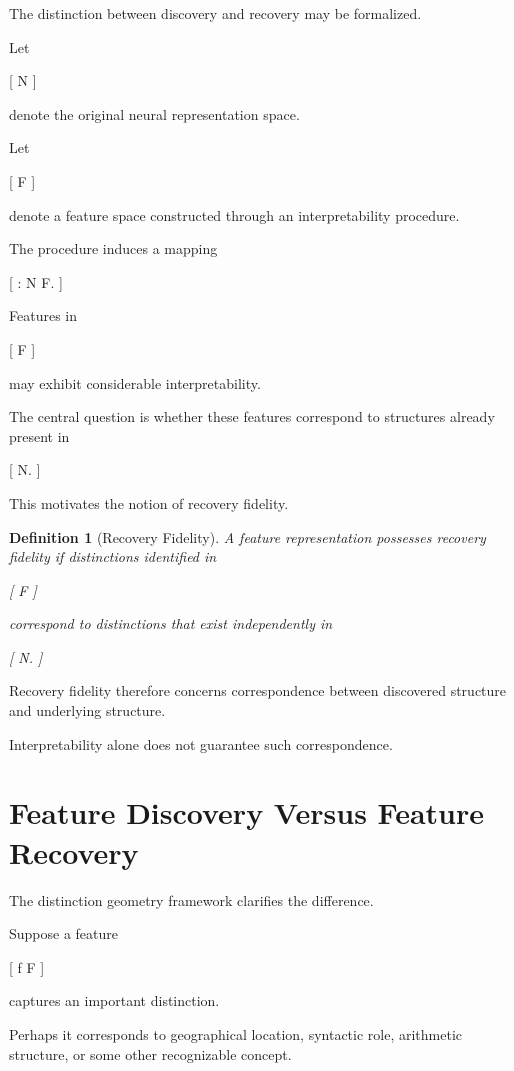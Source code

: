 \documentclass[11pt,oneside,openany]{book}
\newtheorem{definition}{Definition}[chapter] \newtheorem{theorem}{Theorem}[chapter] \newtheorem{proposition}{Proposition}[chapter] \newtheorem{lemma}{Lemma}[chapter] \newtheorem{corollary}{Corollary}[chapter] \newtheorem{remark}{Remark}[chapter]
\begin{document}
The distinction between discovery and recovery may be formalized.

Let

[
\mathcal N
]

denote the original neural representation space.

Let

[
\mathcal F
]

denote a feature space constructed through an interpretability procedure.

The procedure induces a mapping

[
\rho
:
\mathcal N
\rightarrow
\mathcal F.
]

Features in

[
\mathcal F
]

may exhibit considerable interpretability.

The central question is whether these features correspond to structures already present in

[
\mathcal N.
]

This motivates the notion of recovery fidelity.

\begin{definition}[Recovery Fidelity]

A feature representation possesses recovery fidelity if distinctions identified in

[
\mathcal F
]

correspond to distinctions that exist independently in

[
\mathcal N.
]

\end{definition}

Recovery fidelity therefore concerns correspondence between discovered structure and underlying structure.

Interpretability alone does not guarantee such correspondence.

\section{Feature Discovery Versus Feature Recovery}

The distinction geometry framework clarifies the difference.

Suppose a feature

[
f
\in
\mathcal F
]

captures an important distinction.

Perhaps it corresponds to geographical location, syntactic role, arithmetic structure, or some other recognizable concept.
\end{document}
